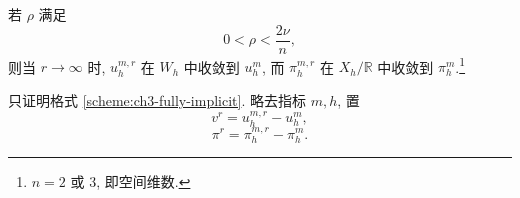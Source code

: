 \begin{Proposition}
\label{prop:ch3-uzawa-convergence}
若 $\rho$ 满足
\begin{equation}
0<\rho<\frac{2\nu}{n},
\label{eq:ch3-uzawa-rho-condition}
\end{equation}
则当 $r\to\infty$ 时, $u_h^{m,r}$ 在 $W_h$ 中收敛到 $u_h^m$, 而 $\pi_h^{m,r}$ 在 $X_h/\mathbb R$ 中收敛到 $\pi_h^m$.\footnote{$n=2$ 或 $3$, 即空间维数.}
\end{Proposition}

\begin{Proof}
只证明格式 \ref{scheme:ch3-fully-implicit}. 略去指标 $m,h$, 置
\begin{equation}
v^r=u_h^{m,r}-u_h^m,
\label{eq:ch3-uzawa-velocity-error}
\end{equation}
\begin{equation}
\pi^r=\pi_h^{m,r}-\pi_h^m.
\label{eq:ch3-uzawa-pressure-error}
\end{equation}


\end{Proof}
